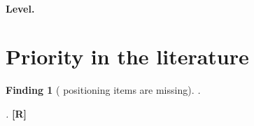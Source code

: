 \documentclass[11pt]{article}
\newcommand{\pk}{P0}
\newif\ifclassification \classificationtrue %
\newif\ifdraftnotes     \draftnotesfalse    %
\newcommand{\defR}{\textbf{[R]}}   %
\theoremstyle{definition}
\newtheorem{finding}{Finding}
\newcommand{\flabel}[1]{\label{\pk:f:#1}}          %
\newcommand{\fref}[1]{Finding~\ref{\pk:f:#1}}      %
\newcommand{\fpref}[1]{(\fref{#1})}
\newcommand{\note}[1]{\ifdraftnotes\textcolor{red}{\small[\,#1\,]}\fi}
\begin{document}
\paragraph{Level.} \note{What kind of work this is, what machinery it requires,
and where its originality actually lies.}

\section{Priority in the literature}

\begin{finding}[\note{n} positioning items are missing]\flabel{priority}
\emph{\note{Antecedent one}.} \note{Author, title, journal, volume, year, pages.
What is shared. What is different. Why making the comparison would sharpen
rather than dilute the claim.}

\emph{\note{Antecedent two}.} \note{\dots}
\defR
\end{finding}


\end{document}

